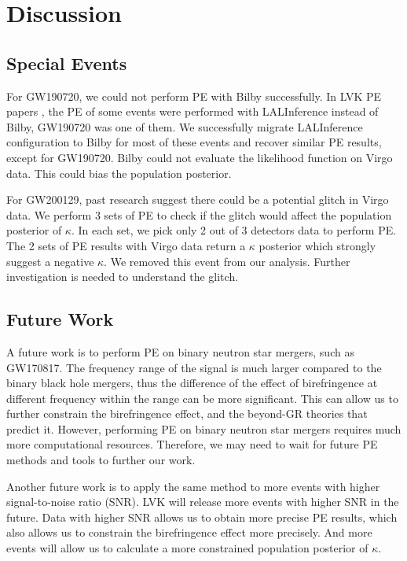 \documentclass[aps,prd,twocolumn,superscriptaddress,preprintnumbers,floatfix,nofootinbib]{revtex4-2}
\begin{document}
\section{Discussion}
\label{sec:Discussion}

\subsection{Special Events}
For GW190720, we could not perform PE with Bilby successfully.
In LVK PE papers \citep{GWTC-2.1, GWTC-3}, the PE of some events were performed with LALInference \citep{lalsuite} instead of Bilby, GW190720 was one of them.
We successfully migrate LALInference configuration to Bilby for most of these events and recover similar PE results, except for GW190720.
Bilby could not evaluate the likelihood function on Virgo data.
This could bias the population posterior.

For GW200129, past research suggest there could be a potential glitch in Virgo data. \citep{GW200129}
We perform 3 sets of PE to check if the glitch would affect the population posterior of $\kappa$.
In each set, we pick only 2 out of 3 detectors data to perform PE.
The 2 sets of PE results with Virgo data return a $\kappa$ posterior which strongly suggest a negative $\kappa$.
We removed this event from our analysis.
Further investigation is needed to understand the glitch.

\subsection{Future Work}
A future work is to perform PE on binary neutron star mergers, such as GW170817.
The frequency range of the signal is much larger compared to the binary black hole mergers, thus the difference of the effect of birefringence at different frequency within the range can be more significant.
This can allow us to further constrain the birefringence effect, and the beyond-GR theories that predict it.
However, performing PE on binary neutron star mergers requires much more computational resources.
Therefore, we may need to wait for future PE methods and tools to further our work.

Another future work is to apply the same method to more events with higher signal-to-noise ratio (SNR).
LVK will release more events with higher SNR in the future.
Data with higher SNR allows us to obtain more precise PE results, which also allows us to constrain the birefringence effect more precisely.
And more events will allow us to calculate a more constrained population posterior of $\kappa$.
\end{document}

